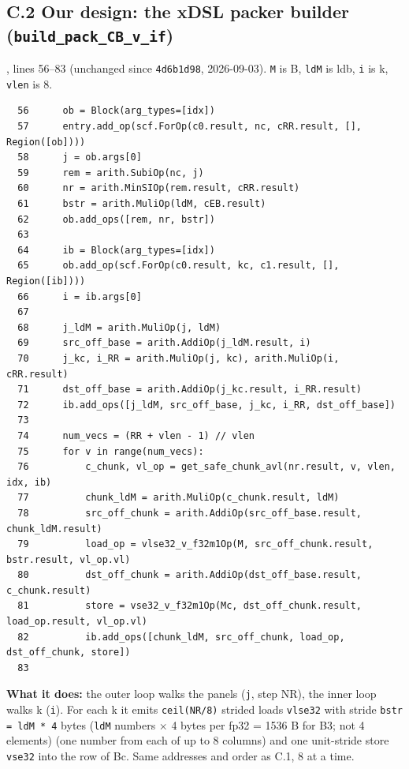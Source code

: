 \documentclass[10pt,a4paper]{article}
\begin{document}
\subsection*{C.2 Our design: the xDSL packer builder (\texttt{build\_pack\_CB\_v\_if})}
, lines 56--83 (unchanged since \texttt{4d6b1d98}, 2026-09-03). \texttt{M} is B,
\texttt{ldM} is ldb, \texttt{i} is k, \texttt{vlen} is 8.
{\scriptsize\begin{verbatim}
  56      ob = Block(arg_types=[idx])
  57      entry.add_op(scf.ForOp(c0.result, nc, cRR.result, [], Region([ob])))
  58      j = ob.args[0]
  59      rem = arith.SubiOp(nc, j)
  60      nr = arith.MinSIOp(rem.result, cRR.result)
  61      bstr = arith.MuliOp(ldM, cEB.result)
  62      ob.add_ops([rem, nr, bstr])
  63  
  64      ib = Block(arg_types=[idx])
  65      ob.add_op(scf.ForOp(c0.result, kc, c1.result, [], Region([ib])))
  66      i = ib.args[0]
  67  
  68      j_ldM = arith.MuliOp(j, ldM)
  69      src_off_base = arith.AddiOp(j_ldM.result, i)
  70      j_kc, i_RR = arith.MuliOp(j, kc), arith.MuliOp(i, cRR.result)
  71      dst_off_base = arith.AddiOp(j_kc.result, i_RR.result)
  72      ib.add_ops([j_ldM, src_off_base, j_kc, i_RR, dst_off_base])
  73  
  74      num_vecs = (RR + vlen - 1) // vlen
  75      for v in range(num_vecs):
  76          c_chunk, vl_op = get_safe_chunk_avl(nr.result, v, vlen, idx, ib)
  77          chunk_ldM = arith.MuliOp(c_chunk.result, ldM)
  78          src_off_chunk = arith.AddiOp(src_off_base.result, chunk_ldM.result)
  79          load_op = vlse32_v_f32m1Op(M, src_off_chunk.result, bstr.result, vl_op.vl)
  80          dst_off_chunk = arith.AddiOp(dst_off_base.result, c_chunk.result)
  81          store = vse32_v_f32m1Op(Mc, dst_off_chunk.result, load_op.result, vl_op.vl)
  82          ib.add_ops([chunk_ldM, src_off_chunk, load_op, dst_off_chunk, store])
  83  
\end{verbatim}}

\textbf{What it does:} the outer loop walks the panels (\texttt{j}, step NR), the inner loop walks k (\texttt{i}). For each k it
emits \texttt{ceil(NR/8)} strided loads \texttt{vlse32} with stride \texttt{bstr = ldM * 4} bytes (\texttt{ldM} numbers $\times$ 4 bytes per fp32 = 1536 B for B3;
not 4 elements) (one number from each of up to 8
columns) and one unit-stride store \texttt{vse32} into the row of Bc. Same addresses and order as C.1, 8 at a time.
\end{document}
